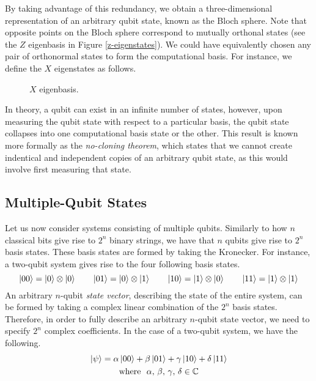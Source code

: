 By taking advantage of this redundancy, we obtain a three-dimensional representation of an arbitrary qubit state, known as the Bloch sphere. Note that opposite points on the Bloch sphere correspond to mutually orthonal states (see the $Z$ eigenbasis in Figure \ref{z-eigenstates}). We could have equivalently chosen any pair of orthonormal states to form the computational basis. For instance, we define the $X$ eigenstates as follows.

\begin{figure}[H]
    \centering
    \begin{minipage}{.45\textwidth}
        \centering
    \end{minipage}%
    \begin{minipage}{0.45\textwidth}
        \centering
    \end{minipage}
    \caption{$X$ eigenbasis.}
    \label{x-eigenstates}
\end{figure}

In theory, a qubit can exist in an infinite number of states, however, upon measuring the qubit state with respect to a particular basis, the qubit state collapses into one computational basis state or the other. This result is known more formally as the \textit{no-cloning theorem}, which states that we cannot create indentical and independent copies of an arbitrary qubit state, as this would involve first measuring that state.

\subsection{Multiple-Qubit States}

Let us now consider systems consisting of multiple qubits. Similarly to how $n$ classical bits give rise to $2^n$ binary strings, we have that $n$ qubits give rise to $2^n$ basis states. These basis states are formed by taking the Kronecker. For instance, a two-qubit system gives rise to the four following basis states.
\begin{equation*}
    \ket{00} = \ket 0 \otimes \ket 0 \qquad
    \ket{01} = \ket 0 \otimes \ket 1 \qquad
    \ket{10} = \ket 1 \otimes \ket 0 \qquad
    \ket{11} = \ket 1 \otimes \ket 1
\end{equation*}
An arbitrary $n$-qubit \textit{state vector}, describing the state of the entire system, can be formed by taking a complex linear combination of the $2^n$ basis states. Therefore, in order to fully describe an arbitrary $n$-qubit state vector, we need to specify $2^n$ complex coefficients. In the case of a two-qubit system, we have the following.
\begin{gather*}
    \ket\psi =
    \alpha \ket{00} +
    \beta \ket{01} +
    \gamma \ket{10} +
    \delta \ket{11} \\
    \text{where} \,\,\,\, \alpha, \, \beta, \, \gamma, \, \delta \in \mathbb{C}
\end{gather*}

